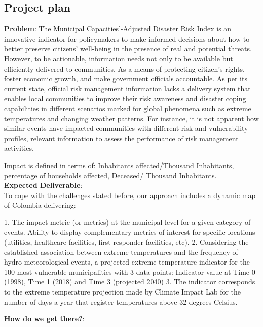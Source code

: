 \documentclass[11pt]{article}
\begin{document}
\subsection{Project plan}

\textbf{Problem}: The Municipal Capacities’-Adjusted Disaster Risk Index is an innovative indicator for policymakers to make informed decisions about how to better preserve citizens’ well-being in the presence of real and potential threats.
However, to be actionable, information needs not only to be available but efficiently delivered to communities. As a means of protecting citizen’s rights, foster economic growth, and make government officials accountable.
As per its current state, official risk management information lacks a delivery system that enables local communities to improve their risk awareness and disaster coping capabilities in different scenarios marked for global phenomena such as extreme temperatures and changing weather patterns.
For instance, it is not apparent how similar events have impacted communities with different risk and vulnerability profiles, relevant information to assess the performance of risk management activities.

 Impact is defined in terms of: Inhabitants affected/Thousand Inhabitants, percentage of households affected, Deceased/ Thousand Inhabitants.\\

\textbf{Expected Deliverable}:\\
To cope with the challenges stated before, our approach includes a dynamic map of Colombia delivering:

1. The impact metric (or metrics) at the municipal level for a given category of events. Ability to display complementary metrics of interest for specific locations (utilities, healthcare facilities, first-responder facilities, etc).
2. Considering the established association between extreme temperatures and the frequency of hydro-meteorological events, a projected extreme-temperature indicator for the 100 most vulnerable municipalities with 3 data points: Indicator value at Time 0 (1998), Time 1 (2018) and Time 3 (projected 2040)
3. The indicator corresponds to the extreme temperature projection made by Climate Impact Lab for the number of days a year that register temperatures above 32 degrees Celsius.

\textbf{How do we get there?}:
\end{document}
